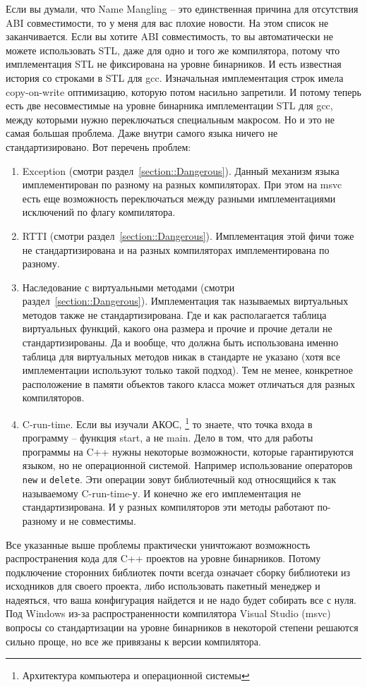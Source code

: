 Если вы думали, что Name Mangling -- это единственная причина для отсутствия ABI совместимости, то у меня для вас плохие новости.
На этом список не заканчивается.
Если вы хотите ABI совместимость, то вы автоматически не можете использовать STL, даже для одно и того же компилятора, потому что имплементация STL не фиксирована на уровне бинарников.
И есть известная история со строками в STL для gcc.
Изначальная имплементация строк имела copy-on-write оптимизацию, которую потом насильно запретили.
И потому теперь есть две несовместимые на уровне бинарника имплементации STL для gcc, между которыми нужно переключаться специальным макросом.
Но и это не самая большая проблема.
Даже внутри самого языка ничего не стандартизировано.
Вот перечень проблем:
\begin{enumerate}
\item Exception (смотри раздел~\ref{section::Dangerous}).
Данный механизм языка имплементирован по разному на разных компиляторах.
При этом на msvc есть еще возможность переключаться между разными имплементациями исключений по флагу компилятора.

\item RTTI (смотри раздел~\ref{section::Dangerous}).
Имплементация этой фичи тоже не стандартизирована и на разных компиляторах имплементирована по разному.

\item Наследование с виртуальными методами (смотри раздел~\ref{section::Dangerous}).
Имплементация так называемых виртуальных методов также не стандартизирована.
Где и как располагается таблица виртуальных функций, какого она размера и прочие и прочие детали не стандартизированы.
Да и вообще, что должна быть использована именно таблица для виртуальных методов никак в стандарте не указано (хотя все имплементации используют только такой подход).
Тем не менее, конкретное расположение в памяти объектов такого класса может отличаться для разных компиляторов.

\item C-run-time.
Если вы изучали АКОС,%
\footnote{Архитектура компьютера и операционной системы}
то знаете, что точка входа в программу -- функция start, а не main.
Дело в том, что для работы программы на C++ нужны некоторые возможности, которые гарантируются языком, но не операционной системой.
Например использование операторов \verb"new" и \verb"delete".
Эти операции зовут библиотечный код относящийся к так называемому C-run-time-у.
И конечно же его имплементация не стандартизирована.
И у разных компиляторов эти методы работают по-разному и не совместимы.
\end{enumerate}
Все указанные выше проблемы практически уничтожают возможность распространения кода для C++ проектов на уровне бинарников.
Потому подключение сторонних библиотек почти всегда означает сборку библиотеки из исходников для своего проекта, либо использовать пакетный менеджер и надеяться, что ваша конфигурация найдется и не надо будет собирать все с нуля.
Под Windows из-за распространенности компилятора Visual Studio (msvc) вопросы со стандартизации на уровне бинарников в некоторой степени решаются сильно проще, но все же привязаны к версии компилятора.

